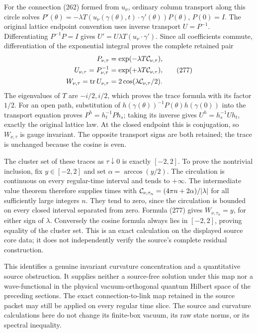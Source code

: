\documentclass[
  11pt,
]{article}
\begin{document}
For the connection (262) formed from \(u_\nu\), ordinary column
transport along this circle solves
\(P'(\theta)=-\lambda T(u_\nu(\gamma(\theta),t)\cdot
\gamma'(\theta))P(\theta)\), \(P(0)=I\). The original lattice endpoint
convention uses inverse transport \(U=P^{-1}\). Differentiating
\(P^{-1}P=I\) gives \(U'=U\lambda T(u_\nu\cdot\gamma')\). Since all
coefficients commute, differentiation of the exponential integral proves
the complete retained pair \[
 \begin{split}
 P_{\nu,\tau}&=\exp(-\lambda T{\cal C}_{\nu,\tau}),\\
 U_{\nu,\tau}=P_{\nu,\tau}^{-1}
    &=\exp(+\lambda T{\cal C}_{\nu,\tau}),\\
 W_{\nu,\tau}=\operatorname{tr}U_{\nu,\tau}
    &=2\cos(\lambda{\cal C}_{\nu,\tau}/2).
 \end{split}
 \tag{277}
\] The eigenvalues of \(T\) are \(-i/2,i/2\), which proves the trace
formula with its factor \(1/2\). For an open path, substitution of
\(h(\gamma(\theta))^{-1}P(\theta)h(\gamma(0))\) into the transport
equation proves \(P^h=h_t^{-1}Ph_s\); taking its inverse gives
\(U^h=h_s^{-1}Uh_t\), exactly the original lattice law. At the closed
endpoint this is conjugation, so \(W_{\nu,\tau}\) is gauge invariant.
The opposite transport signs are both retained; the trace is unchanged
because the cosine is even.

The cluster set of these traces as \(\tau\downarrow0\) is exactly
\([-2,2]\). To prove the nontrivial inclusion, fix \(y\in[-2,2]\) and
set \(\alpha=\arccos(y/2)\). The circulation is continuous on every
regular-time interval and tends to \(+\infty\). The intermediate value
theorem therefore supplies times with
\({\cal C}_{\nu,\tau_n}=(4\pi n+2\alpha)/|\lambda|\) for all
sufficiently large integers \(n\). They tend to zero, since the
circulation is bounded on every closed interval separated from zero.
Formula (277) gives \(W_{\nu,\tau_n}=y\), for either sign of
\(\lambda\). Conversely the cosine formula always lies in \([-2,2]\),
proving equality of the cluster set. This is an exact calculation on the
displayed source core data; it does not independently verify the
source's complete residual construction.

This identifies a genuine invariant curvature concentration and a
quantitative source obstruction. It supplies neither a source-free
solution under this map nor a wave-functional in the physical
vacuum-orthogonal quantum Hilbert space of the preceding sections. The
exact connection-to-link map retained in the source packet may still be
applied on every regular time slice. The source and curvature
calculations here do not change its finite-box vacuum, its raw state
norms, or its spectral inequality.
\end{document}
